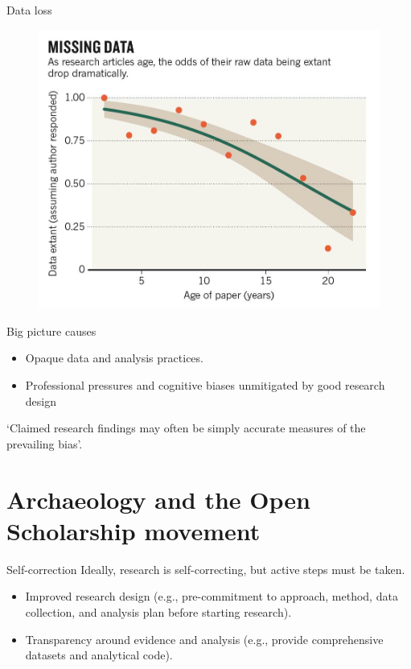 \documentclass[aspectratio=169, 11pt]{beamer} %
\begin{document}
\begin{frame}{Data loss}
 \begin{figure}[H]
    \centering
        \includegraphics[height=.75\textheight]{figures/Missing-Data.png}
        \caption{\cite{Vines2014-zr}}
        \label{fig:vines2014}
 \end{figure}
\end{frame}

\begin{frame}{Big picture causes}
    \begin{itemize}[label=\textbullet]
        \item Opaque data and analysis practices. \cite{Marwick2017-bz}
        \item Professional pressures and cognitive biases unmitigated by good research design \cite{Muthukrishna2019-kt}
    \end{itemize}
    `Claimed research findings may often be simply accurate measures of the prevailing bias'. \cite{Alberts2015-nq} \par
\end{frame}

\section{Archaeology and the Open Scholarship movement}

\begin{frame}{Self-correction}
Ideally, research is self-correcting, but active steps must be taken.
    \begin{itemize}[label=\textbullet]
        \item Improved research design (e.g., pre-commitment to approach, method, data collection, and analysis plan before starting research).
        \item Transparency around evidence and analysis (e.g., provide comprehensive datasets and analytical code).
    \end{itemize}
\end{frame}
\end{document}
